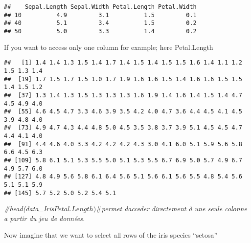 \documentclass[
]{article}
\newenvironment{Shaded}{\begin{snugshade}}{\end{snugshade}}
\newcommand{\CommentTok}[1]{\textcolor[rgb]{0.56,0.35,0.01}{\textit{#1}}}
\newcommand{\FunctionTok}[1]{\textcolor[rgb]{0.13,0.29,0.53}{\textbf{#1}}}
\newcommand{\NormalTok}[1]{#1}
\newcommand{\SpecialCharTok}[1]{\textcolor[rgb]{0.81,0.36,0.00}{\textbf{#1}}}
\newcommand{\StringTok}[1]{\textcolor[rgb]{0.31,0.60,0.02}{#1}}
\begin{document}
\begin{verbatim}
##    Sepal.Length Sepal.Width Petal.Length Petal.Width
## 10          4.9         3.1          1.5         0.1
## 40          5.1         3.4          1.5         0.2
## 50          5.0         3.3          1.4         0.2
\end{verbatim}

If you want to access only one column for example; here Petal.Length

\begin{Shaded}
\end{Shaded}

\begin{verbatim}
##   [1] 1.4 1.4 1.3 1.5 1.4 1.7 1.4 1.5 1.4 1.5 1.5 1.6 1.4 1.1 1.2 1.5 1.3 1.4
##  [19] 1.7 1.5 1.7 1.5 1.0 1.7 1.9 1.6 1.6 1.5 1.4 1.6 1.6 1.5 1.5 1.4 1.5 1.2
##  [37] 1.3 1.4 1.3 1.5 1.3 1.3 1.3 1.6 1.9 1.4 1.6 1.4 1.5 1.4 4.7 4.5 4.9 4.0
##  [55] 4.6 4.5 4.7 3.3 4.6 3.9 3.5 4.2 4.0 4.7 3.6 4.4 4.5 4.1 4.5 3.9 4.8 4.0
##  [73] 4.9 4.7 4.3 4.4 4.8 5.0 4.5 3.5 3.8 3.7 3.9 5.1 4.5 4.5 4.7 4.4 4.1 4.0
##  [91] 4.4 4.6 4.0 3.3 4.2 4.2 4.2 4.3 3.0 4.1 6.0 5.1 5.9 5.6 5.8 6.6 4.5 6.3
## [109] 5.8 6.1 5.1 5.3 5.5 5.0 5.1 5.3 5.5 6.7 6.9 5.0 5.7 4.9 6.7 4.9 5.7 6.0
## [127] 4.8 4.9 5.6 5.8 6.1 6.4 5.6 5.1 5.6 6.1 5.6 5.5 4.8 5.4 5.6 5.1 5.1 5.9
## [145] 5.7 5.2 5.0 5.2 5.4 5.1
\end{verbatim}

\begin{Shaded}
\begin{Highlighting}[]
\CommentTok{\#head(data\_Iris$Petal.Length) \#$permet d\textquotesingle{}acceder directement à une seule colonne a partir du jeu de données.}
\end{Highlighting}
\end{Shaded}

Now imagine that we want to select all rows of the iris species
``setosa''

\begin{Shaded}
\end{Shaded}
\end{document}
